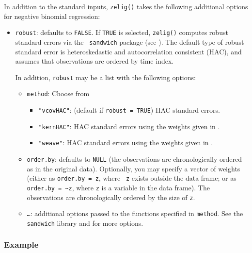 \documentclass{article}
\begin{document}
In addition to the standard inputs, {\tt zelig()} takes the following
additional options for negative binomial regression:  
\begin{itemize}
\item {\tt robust}: defaults to {\tt FALSE}.  If {\tt TRUE} is
selected, {\tt zelig()} computes robust standard errors via the {\tt
sandwich} package (see \cite{Zeileis04}).  The default type of robust
standard error is heteroskedastic and autocorrelation consistent (HAC),
and assumes that observations are ordered by time index.

In addition, {\tt robust} may be a list with the following options:  
\begin{itemize}
\item {\tt method}:  Choose from 
\begin{itemize}
\item {\tt "vcovHAC"}: (default if {\tt robust = TRUE}) HAC standard
errors. 
\item {\tt "kernHAC"}: HAC standard errors using the
weights given in \cite{Andrews91}. 
\item {\tt "weave"}: HAC standard errors using the
weights given in \cite{LumHea99}.  
\end{itemize}  
\item {\tt order.by}: defaults to {\tt NULL} (the observations are
chronologically ordered as in the original data).  Optionally, you may
specify a vector of weights (either as {\tt order.by = z}, where {\tt
z} exists outside the data frame; or as {\tt order.by = \~{}z}, where
{\tt z} is a variable in the data frame).  The observations are
chronologically ordered by the size of {\tt z}.
\item {\tt \dots}:  additional options passed to the functions 
specified in {\tt method}.   See the {\tt sandwich} library and
\cite{Zeileis04} for more options.   
\end{itemize}
\end{itemize}

\subsubsection{Example}
\end{document}
